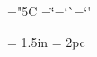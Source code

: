 {%
%
\def\textdegree{$^\circ$}

%
\ifx\Orb\thisisundefined
\def\Orb{\mathhexbox20D}
\fi

\chardef\quotedblleft="5C
\chardef\quotedblright=`\"
\chardef\quoteleft=`\`
\chardef\quoteright=`\'



\newskip\titlepagetopglue \titlepagetopglue = 1.5in
\newskip\titlepagebottomglue \titlepagebottomglue = 2pc

\newif\ifseenauthor
\newif\iffinishedtitlepage

%
\newif\ifsetcontentsaftertitlepage
 \let\setcontentsaftertitlepage = \setcontentsaftertitlepagetrue
\newif\ifsetshortcontentsaftertitlepage
 \let\setshortcontentsaftertitlepage = \setshortcontentsaftertitlepagetrue

\parseargdef{}

\envdef\titlepage{%
  \begingroup
    \parindent=0pt \textfonts
    \vglue\titlepagetopglue
    \finishedtitlepagetrue
    \let\oldpage = \page
    \def\page{%
      \iffinishedtitlepage\else
	 \finishtitlepage
      \fi
      \let\page = \oldpage
      \page
      \null
    }%
}

\def\Etitlepage{%
    \iffinishedtitlepage\else
	\finishtitlepage
    \fi
    \oldpage
  \endgroup
  \HEADINGSon
  \ifsetshortcontentsaftertitlepage
    \shortcontents
    \contents
    \global\let\shortcontents = \relax
    \global\let\contents = \relax
  \fi
  \ifsetcontentsaftertitlepage
    \contents
    \global\let\contents = \relax
    \global\let\shortcontents = \relax
  \fi
}

}
